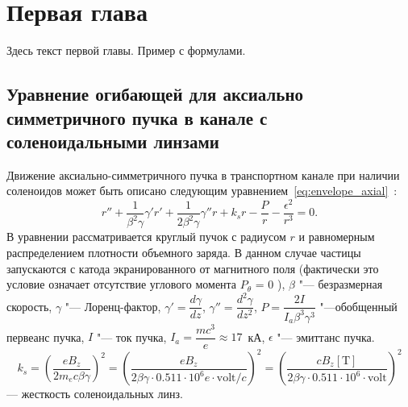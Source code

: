 \chapter{Первая глава}
Здесь текст первой главы. Пример с формулами.

\section{Уравнение огибающей для аксиально симметричного пучка в канале с соленоидальными линзами}
Движение аксиально-симметричного пучка в транспортном канале при наличии соленоидов может быть описано следующим уравнением~\ref{eq:envelope_axial}~\cite{Louson}:
\begin{equation}
    \label{eq:envelope_axial}
    \displaystyle r'' + \frac{1}{\beta^2\gamma} \gamma' r' + \frac{1}{2\beta^2\gamma}\gamma''r + k_sr - \frac{P}{r} - \frac{\epsilon^2}{r^3} = 0. 
\end{equation}
В уравнении рассматривается круглый пучок с радиусом $r$ и равномерным распределением плотности объемного заряда. В данном случае частицы запускаются с катода экранированного от магнитного поля (фактически это условие означает отсутствие углового момента $P_{\theta}$ = 0 ), $\beta$ "--- безразмерная скорость, $\gamma$ "--- Лоренц-фактор, $\gamma' = \dfrac{d\gamma}{dz}$, $\gamma'' = \dfrac{d^2\gamma}{dz^2}$,  $P = \dfrac{2I}{I_a\beta^3\gamma^3}$ "---обобщенный первеанс пучка, $I$ "--- ток пучка, $I_a = \dfrac{mc^3}{e} \approx 17$~кА, $\epsilon$ "--- эмиттанс пучка.
\[k_s =  \left ( \frac{eB_z}{2m_ec\beta\gamma} \right )^2 = \left ( \frac{e B_z}{2\beta\gamma\cdot 0.511\cdot 10^6 e \cdot \mathrm{volt}/c} \right )^2 =
\left ( \frac{cB_z[\mathrm{T}]}{2\beta\gamma\cdot 0.511\cdot 10^6 \cdot \mathrm{volt}} \right )^2\] --- жесткость соленоидальных линз. 
